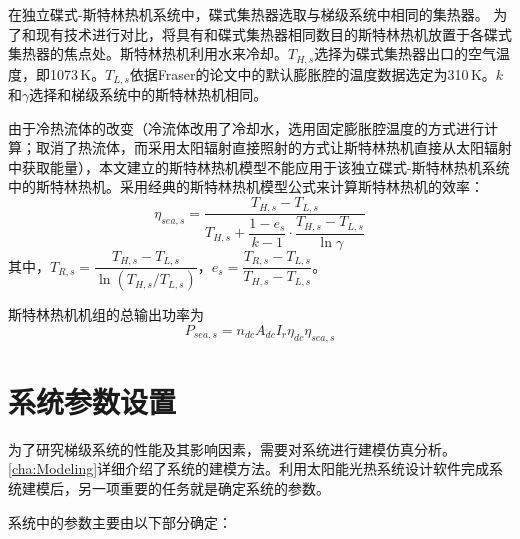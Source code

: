 在独立碟式-斯特林热机系统中，碟式集热器选取与梯级系统中相同的集热器。
为了和现有技术进行对比，将具有和碟式集热器相同数目的斯特林热机放置于各碟式集热器的焦点处。斯特林热机利用水来冷却。$T_{H,s}$选择为碟式集热器出口的空气温度，即1073$\,\mathrm{K}$。$T_{L,s}$依据Fraser的论文\cite{Fraser2008}中的默认膨胀腔的温度数据选定为310$\,\mathrm{K}$。$k$和$\gamma$选择和梯级系统中的斯特林热机相同。

由于冷热流体的改变（冷流体改用了冷却水，选用固定膨胀腔温度的方式进行计算；取消了热流体，而采用太阳辐射直接照射的方式让斯特林热机直接从太阳辐射中获取能量），本文建立的斯特林热机模型不能应用于该独立碟式-斯特林热机系统中的斯特林热机。采用经典的斯特林热机模型公式来计算斯特林热机的效率\cite{Stine1998}：
\begin{equation}
	\eta_{sea,s}=\dfrac{T_{H,s}-T_{L,s}}{T_{H,s}+\dfrac{1-e_{s}}{k-1}\cdot\dfrac{T_{H,s}-T_{L,s}}{\ln\gamma}}
\end{equation}
其中，$T_{R,s}=\dfrac{T_{H,s}-T_{L,s}}{\ln(T_{H,s}/T_{L,s})}$，$e_{s}=\dfrac{T_{R,s}-T_{L,s}}{T_{H,s}-T_{L,s}}$。

斯特林热机机组的总输出功率为
\begin{equation}
	P_{sea,s}=n_{dc}A_{dc}I_r\eta_{dc}\eta_{sea,s}
\end{equation}

\section{系统参数设置}

为了研究梯级系统的性能及其影响因素，需要对系统进行建模仿真分析。\autoref{cha:Modeling}详细介绍了系统的建模方法。利用太阳能光热系统设计软件完成系统建模后，另一项重要的任务就是确定系统的参数。

系统中的参数主要由以下部分确定：

